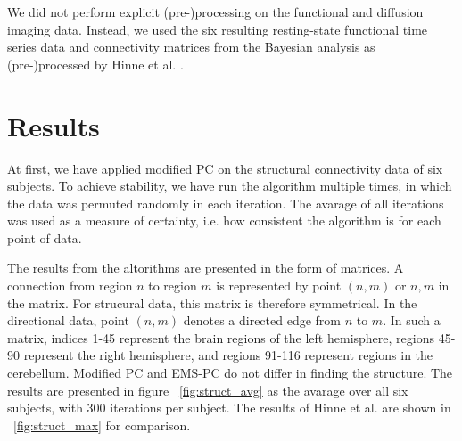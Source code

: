 \documentclass[a4paper, 10pt, english, onecolumn]{article}
\begin{document}
We did not perform explicit (pre-)processing on the functional and diffusion imaging data.
Instead, we used the six resulting resting-state functional time series data and connectivity matrices from the Bayesian analysis as (pre-)processed by Hinne et al. \cite{hinne2013}.

\section{Results}
At first, we have applied modified PC on the structural connectivity data of six subjects.
To achieve stability, we have run the algorithm multiple times, in which the data was permuted randomly in each iteration.
The avarage of all iterations was used as a measure of certainty, i.e. how consistent the algorithm is for each point of data.

The results from the altorithms are presented in the form of matrices.
A connection from region $n$ to region $m$ is represented by point $(n,m)$ or $n,m$ in the matrix.
For strucural data, this matrix is therefore symmetrical.
In the directional data, point $(n,m)$ denotes a directed edge from $n$ to $m$.
In such a matrix, indices 1-45 represent the brain regions of the left hemisphere, regions 45-90 represent the right hemisphere, and regions 91-116 represent regions in the cerebellum. %
Modified PC and EMS-PC do not differ in finding the structure.
The results are presented in figure ~\ref{fig:struct_avg} as the avarage over all six subjects, with 300 iterations per subject.
The results of Hinne et al. are shown in ~\ref{fig:struct_max} for comparison.
\end{document}
